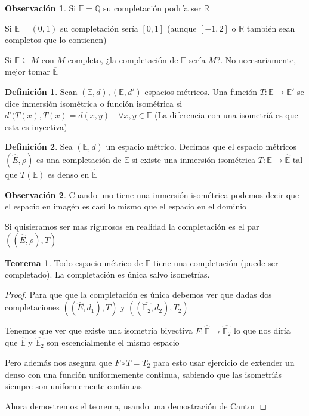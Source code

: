 \documentclass[12pt]{article}
\newcommand{\Q}{\mathbb{Q}}
\newcommand{\R}{\mathbb{R}}
\newcommand{\E}{\mathbb{E}}
\newcommand{\ra}{\rightarrow}
\newcommand{\ol}{\overline}
\theoremstyle{definition}
\newtheorem{definition}{Definición}[section]
\newtheorem*{remark}{Observación}
\newtheorem{theorem}{Teorema}
\begin{document}
\begin{remark}
  Si $\E = \Q$ su completación podría ser $\R$

  Si $\E = (0,1)$ su completación sería $[0,1]$ (aunque $[-1,2]$ o $\R$ también sean completos que lo contienen)

  Si $\E \subseteq M$ con $M$ completo, ¿la completación de $\E$ sería $M$?. No necesariamente, mejor tomar $\ol{\E}$
\end{remark}
\begin{definition} 
  Sean $(\E,d), (\E,d')$ espacios métricos. Una función $T : \E \ra \E '$ se dice inmersión isométrica o función isométrica si $d'(T(x),T(x) = d(x,y) \quad \forall x,y \in \E$ (La diferencia con una isometríá es que esta es inyectiva)
\end{definition}
\begin{definition}
  Sea $(\E,d)$ un espacio métrico. Decimos que el espacio métricos $(\hat{E},\rho)$ es una completación de $\E$ si existe una inmersión isométrica $T: \E \ra \hat{\E}$ tal que $T(\E)$ es denso en $\hat{\E}$ 
\end{definition}
\begin{remark}
  Cuando uno tiene una inmersión isométrica podemos decir que el espacio en imagén es casi lo mismo que el espacio en el dominio

Si quisieramos ser mas rigurosos en realidad la completación es el par $((\hat{E},\rho), T)$
\end{remark}
\begin{theorem}
  Todo espacio métrico de $\E$ tiene una completación (puede ser completado). La completación es única salvo isometrías.
\end{theorem}
\begin{proof}
  Para que que la completación es única debemos ver que dadas dos completaciones $((\hat{E},d_1),T)$ y $( (\hat{\E_2}, d_2),T_2 )$ 

  Tenemos que ver que existe una isometría biyectiva $F :\hat{\E} \ra \hat{\E_2}$ lo que nos diría que $\hat{\E}$ y $\hat{\E_2}$ son escencialmente el mismo espacio

  Pero además nos asegura que $F \circ T = T_2$ para esto usar ejercicio de extender un denso con una función uniformemente continua, sabiendo que las isometríás siempre son uniformemente continuas 

  Ahora demostremos el teorema, usando una demostración de Cantor

   
\end{proof}
\end{document}
